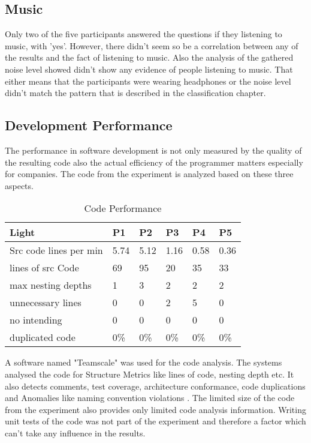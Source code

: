\subsection{Music}
Only two of the five participants answered the questions if they listening to music, with 'yes'. However, there didn't seem so be a correlation between any of the results and the fact of listening to music. Also the analysis of the gathered noise level showed didn't show any evidence of people listening to music. That either means that the participants were wearing headphones or the noise level didn't match the pattern that is described in the classification chapter. 

\subsection{Development Performance}
The performance in software development is not only measured by the quality of the resulting code also the actual efficiency of the programmer matters especially for companies.
The code from the experiment is analyzed based on these three aspects.  

\begin{table}[ht]
  \begin{tabular}{|P{2.5cm}|P{1.8cm}|P{1.8cm}|P{1.8cm}|P{1.8cm}|P{1.8cm}|}
   	\textbf{Light}				& \textbf{P1}			& \textbf{P2}			& 	\textbf{P3}		& 	\textbf{P4}			& 	\textbf{P5}			\\ \hline
  	Src code lines per min	& 5.74						& 5.12						& 	1.16					& 0.58						& 0.36						\\ \hline
  	lines of src Code 			& 69							& 95							& 	20					& 35							& 33							\\ \hline
  	max nesting depths		& 1							& 3							& 	2						& 2							& 2							\\ \hline
  	unnecessary lines			& 0							& 0							& 	2						& 5							& 0							\\ \hline
  	no intending					& 0							& 0							& 	0						& 0							& 0							\\ \hline
  	duplicated code			& 0\%						& 0\%						&	 0\%					& 0\%						& 0\%						\\ \hline
  	\end{tabular}
  	\newline\newline
  	\caption{Code Performance}\label{codePerformance}
\end{table}

A software named "Teamscale" was used for the code analysis. The systems analysed the code for Structure Metrics like lines of code, nesting depth etc. It also detects comments, test coverage, architecture conformance, code duplications and Anomalies like naming convention violations \cite{heinemann2014teamscale}.
\bigbreak
The limited size of the code from the experiment also provides only limited code analysis information. 
Writing unit tests of the code was not part of the experiment and therefore a factor which can't take any influence in the results. 

